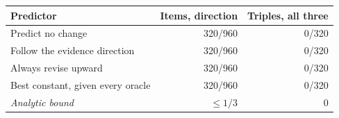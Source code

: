 \begin{tabular}{lrr}
\toprule
Predictor & Items, direction & Triples, all three \\
\midrule
Predict no change & 320/960 & 0/320 \\
Follow the evidence direction & 320/960 & 0/320 \\
Always revise upward & 320/960 & 0/320 \\
Best constant, given every oracle & 320/960 & 0/320 \\
\emph{Analytic bound} & $\leq 1/3$ & $0$ \\
\bottomrule
\end{tabular}
